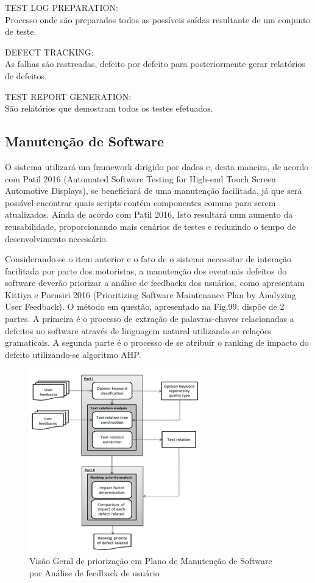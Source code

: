 \documentclass[12pt]{article}
\begin{document}
TEST LOG PREPARATION: \\
Processo onde são preparados todos as possíveis saídas resultante de um conjunto de teste.

DEFECT TRACKING: \\
As falhas são rastreadas, defeito por defeito para posteriormente gerar relatórios de defeitos.

TEST REPORT GENERATION: \\
São relatórios que demostram todos os testes efetuados.


\subsection{Manutenção de Software}

O sistema utilizará um framework dirigido por dados e, desta maneira, de acordo com Patil 2016 (Automated Software Testing for High-end Touch Screen Automotive Displays), se beneficiará de uma manutenção facilitada, já que será possível encontrar quais scripts contém componentes comuns para serem atualizados. Ainda de acordo com Patil 2016, Isto resultará num aumento da reusabilidade, proporcionando mais cenários de testes e reduzindo o tempo de desenvolvimento necessário.

Considerando-se o item anterior e o fato de o sistema necessitar de interação facilitada por parte dos motoristas, a manutenção dos eventuais defeitos do software deverão priorizar a análise de feedbacks dos usuários, como apresentam Kittiya e Pornsiri 2016 (Prioritizing Software Maintenance Plan by Analyzing User Feedback). O método em questão, apresentado na Fig.99, dispõe de 2 partes. A primeira é o processo de extração de palavras-chaves relacionadas a defeitos no software através de linguagem natural utilizando-se relações gramaticais. A segunda parte é o processo de se atribuir o ranking de impacto do defeito utilizando-se algoritmo AHP.


\begin{figure}[ht]
\includegraphics[scale=.8, center] {swebok_manutencao.png}
\caption{Visão Geral de priorização em Plano de Manutenção de Software por Análise de feedback de usuário}
\label{fig:exampleFig2}
\end{figure}
\end{document}
